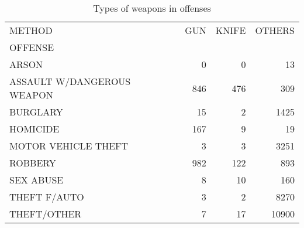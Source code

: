 \begin{table}
\centering
\caption{Types of weapons in offenses}
\label{tab:method_offense_written}
\begin{tabular}{lrrr}
\toprule
METHOD &  GUN &  KNIFE &  OTHERS \\
OFFENSE                    &      &        &         \\
\midrule
ARSON                      &    0 &      0 &      13 \\
ASSAULT W/DANGEROUS WEAPON &  846 &    476 &     309 \\
BURGLARY                   &   15 &      2 &    1425 \\
HOMICIDE                   &  167 &      9 &      19 \\
MOTOR VEHICLE THEFT        &    3 &      3 &    3251 \\
ROBBERY                    &  982 &    122 &     893 \\
SEX ABUSE                  &    8 &     10 &     160 \\
THEFT F/AUTO               &    3 &      2 &    8270 \\
THEFT/OTHER                &    7 &     17 &   10900 \\
\bottomrule
\end{tabular}
\end{table}
